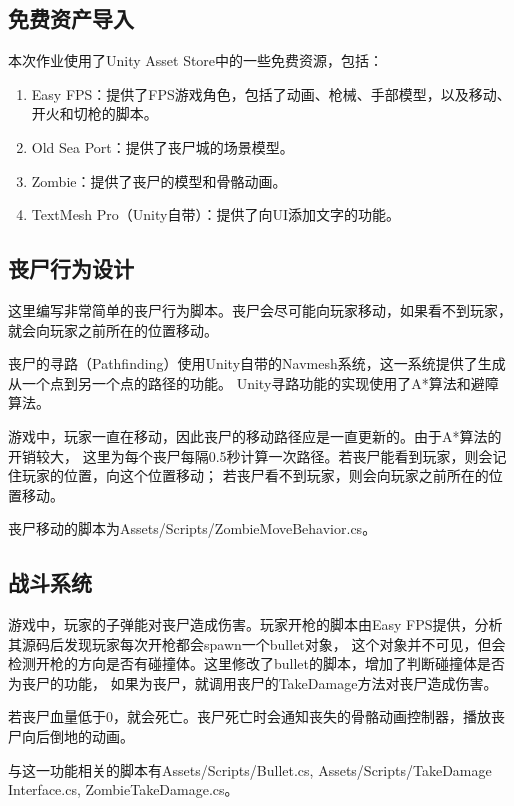 \documentclass{article}
\begin{document}
\subsection{免费资产导入}

本次作业使用了Unity Asset Store中的一些免费资源，包括：

\begin{enumerate}
    \item Easy FPS：提供了FPS游戏角色，包括了动画、枪械、手部模型，以及移动、开火和切枪的脚本。
    \item Old Sea Port：提供了丧尸城的场景模型。
    \item Zombie：提供了丧尸的模型和骨骼动画。
    \item TextMesh Pro（Unity自带）：提供了向UI添加文字的功能。
\end{enumerate}

\subsection{丧尸行为设计}

这里编写非常简单的丧尸行为脚本。丧尸会尽可能向玩家移动，如果看不到玩家，就会向玩家之前所在的位置移动。

丧尸的寻路（Pathfinding）使用Unity自带的Navmesh系统，这一系统提供了生成从一个点到另一个点的路径的功能。
Unity寻路功能的实现使用了A*算法和避障算法。

游戏中，玩家一直在移动，因此丧尸的移动路径应是一直更新的。由于A*算法的开销较大，
这里为每个丧尸每隔0.5秒计算一次路径。若丧尸能看到玩家，则会记住玩家的位置，向这个位置移动；
若丧尸看不到玩家，则会向玩家之前所在的位置移动。

丧尸移动的脚本为Assets/Scripts/ZombieMoveBehavior.cs。

\subsection{战斗系统}

游戏中，玩家的子弹能对丧尸造成伤害。玩家开枪的脚本由Easy FPS提供，分析其源码后发现玩家每次开枪都会spawn一个bullet对象，
这个对象并不可见，但会检测开枪的方向是否有碰撞体。这里修改了bullet的脚本，增加了判断碰撞体是否为丧尸的功能，
如果为丧尸，就调用丧尸的TakeDamage方法对丧尸造成伤害。

若丧尸血量低于0，就会死亡。丧尸死亡时会通知丧失的骨骼动画控制器，播放丧尸向后倒地的动画。

与这一功能相关的脚本有Assets/Scripts/Bullet.cs,
Assets/Scripts/TakeDamage Interface.cs,
ZombieTakeDamage.cs。
\end{document}

